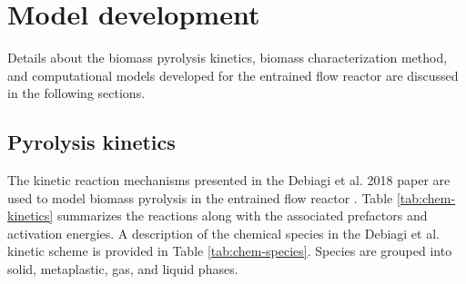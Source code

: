 
\section{Model development}

Details about the biomass pyrolysis kinetics, biomass characterization method, and computational models developed for the entrained flow reactor are discussed in the following sections.

\subsection{Pyrolysis kinetics}

The kinetic reaction mechanisms presented in the Debiagi et al. 2018 paper are used to model biomass pyrolysis in the entrained flow reactor \cite{Debiagi-2018}. Table \ref{tab:chem-kinetics} summarizes the reactions along with the associated prefactors and activation energies. A description of the chemical species in the Debiagi et al. kinetic scheme is provided in Table \ref{tab:chem-species}. Species are grouped into solid, metaplastic, gas, and liquid phases.

